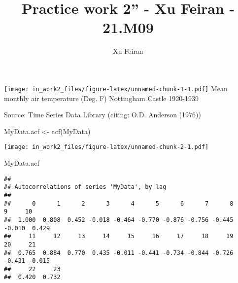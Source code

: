 \documentclass[
]{article}
\title{Practice work 2'' - Xu Feiran - 21.M09}
\author{Xu Feiran}
\date{}
\newenvironment{Shaded}{\begin{snugshade}}{\end{snugshade}}
\newcommand{\AttributeTok}[1]{\textcolor[rgb]{0.77,0.63,0.00}{#1}}
\newcommand{\DecValTok}[1]{\textcolor[rgb]{0.00,0.00,0.81}{#1}}
\newcommand{\FunctionTok}[1]{\textcolor[rgb]{0.00,0.00,0.00}{#1}}
\newcommand{\NormalTok}[1]{#1}
\newcommand{\OtherTok}[1]{\textcolor[rgb]{0.56,0.35,0.01}{#1}}
\newcommand{\SpecialCharTok}[1]{\textcolor[rgb]{0.00,0.00,0.00}{#1}}
\newcommand{\StringTok}[1]{\textcolor[rgb]{0.31,0.60,0.02}{#1}}
\begin{document}
\maketitle

{
\setcounter{tocdepth}{3}
\tableofcontents
}
\begin{Shaded}
\end{Shaded}

\texttt{[image: in\_work2\_files/figure-latex/unnamed-chunk-1-1.pdf]} Mean
monthly air temperature (Deg. F) Nottingham Castle 1920-1939

Source: Time Series Data Library (citing: O.D. Anderson (1976))

\begin{Shaded}
\begin{Highlighting}[]
\NormalTok{MyData.acf }\OtherTok{\textless{}{-}} \FunctionTok{acf}\NormalTok{(MyData)}
\end{Highlighting}
\end{Shaded}

\texttt{[image: in\_work2\_files/figure-latex/unnamed-chunk-2-1.pdf]}

\begin{Shaded}
\begin{Highlighting}[]
\NormalTok{MyData.acf}
\end{Highlighting}
\end{Shaded}

\begin{verbatim}
## 
## Autocorrelations of series 'MyData', by lag
## 
##      0      1      2      3      4      5      6      7      8      9     10 
##  1.000  0.808  0.452 -0.018 -0.464 -0.770 -0.876 -0.756 -0.445 -0.010  0.429 
##     11     12     13     14     15     16     17     18     19     20     21 
##  0.765  0.884  0.770  0.435 -0.011 -0.441 -0.734 -0.844 -0.726 -0.431 -0.015 
##     22     23 
##  0.420  0.732
\end{verbatim}
\end{document}
